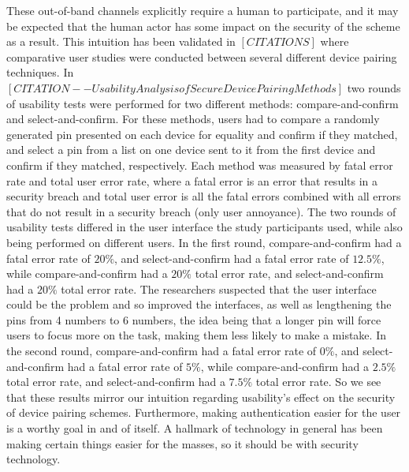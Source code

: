 \documentclass[12pt]{report}
\begin{document}
These out-of-band channels explicitly require a human to participate, and it may be expected that the human actor has some impact on the security of the scheme as a result. This intuition has been validated in $[CITATIONS]$ where comparative user studies were conducted between several different device pairing techniques. In $[CITATION--Usability Analysis of Secure Device Pairing Methods]$ two rounds of usability tests were performed for two different methods: compare-and-confirm and select-and-confirm. For these methods, users had to compare a randomly generated pin presented on each device for equality and confirm if they matched, and select a pin from a list on one device sent to it from the first device and confirm if they matched, respectively. Each method was measured by fatal error rate and total user error rate, where a fatal error is an error that results in a security breach and total user error is all the fatal errors combined with all errors that do not result in a security breach (only user annoyance). The two rounds of usability tests differed in the user interface the study participants used, while also being performed on different users. In the first round, compare-and-confirm had a fatal error rate of $20\%$, and select-and-confirm had a fatal error rate of $12.5\%$, while compare-and-confirm had a $20\%$ total error rate, and select-and-confirm had a $20\%$ total error rate. The researchers suspected that the user interface could be the problem and so improved the interfaces, as well as lengthening the pins from 4 numbers to 6 numbers, the idea being that a longer pin will force users to focus more on the task, making them less likely to make a mistake. In the second round, compare-and-confirm had a fatal error rate of $0\%$, and select-and-confirm had a fatal error rate of $5\%$, while compare-and-confirm had a $2.5\%$ total error rate, and select-and-confirm had a $7.5\%$ total error rate. So we see that these results mirror our intuition regarding usability's effect on the security of device pairing schemes. Furthermore, making authentication easier for the user is a worthy goal in and of itself. A hallmark of technology in general has been making certain things easier for the masses, so it should be with security technology. 
\end{document}

